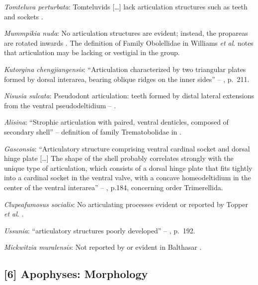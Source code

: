 \documentclass[]{book}
\theoremstyle{definition}
\theoremstyle{definition}
\theoremstyle{definition}
\theoremstyle{remark}
\begin{document}
\emph{Tomteluva perturbata}: Tomteluvids {[}\ldots{}{]} lack
articulation structures such as teeth and sockets
\citep{Streng2016Anew}.

\emph{Mummpikia nuda}: No articulation structures are evident; instead,
the propareas are rotated inwards \citep{Balthasar2008iMummpikia}. The
definition of Family Obolellidae in Williams \emph{et al}.
\citeyearpar{Williams2000BrachiopodaLinguliformea} notes that
articulation may be lacking or vestigial in the group.

\emph{Kutorgina chengjiangensis}: ``Articulation characterized by two
triangular plates formed by dorsal interarea, bearing oblique ridges on
the inner sides'' -- \citet{Williams2000BrachiopodaLinguliformea},
p.~211.

\emph{Nisusia sulcata}: Pseudodont articulation: teeth formed by distal
lateral extensions from the ventral pseudodeltidium --
\citet{Holmer2018Evolutionarysignificance}.

\emph{Alisina}: ``Strophic articulation with paired, ventral denticles,
composed of secondary shell'' -- definition of family Trematobolidae in
\citet{Williams2000BrachiopodaLinguliformea}.

\emph{Gasconsia}: ``Articulatory structure comprising ventral cardinal
socket and dorsal hinge plate {[}\ldots{}{]} The shape of the shell
probably correlates strongly with the unique type of articulation, which
consists of a dorsal hinge plate that fits tightly into a cardinal
socket in the ventral valve, with a concave homeodeltidium in the center
of the ventral interarea'' --
\citet{Williams2000BrachiopodaLinguliformea}, p.184, concerning order
Trimerellida.

\emph{Clupeafumosus socialis}: No articulating processes evident or
reported by Topper \emph{et al}. \citeyearpar{Topper2013Reappraisalof}.

\emph{Ussunia}: ``articulatory structures poorly developed'' --
\citet{Williams2000BrachiopodaLinguliformea}, p.~192.

\emph{Mickwitzia muralensis}: Not reported by or evident in Balthasar
\citeyearpar{Balthasar2004Shellstructure}.

\hypertarget{apophyses-morphology}{%
\subsection*{{[}6{]} Apophyses: Morphology}\label{apophyses-morphology}}
\end{document}
